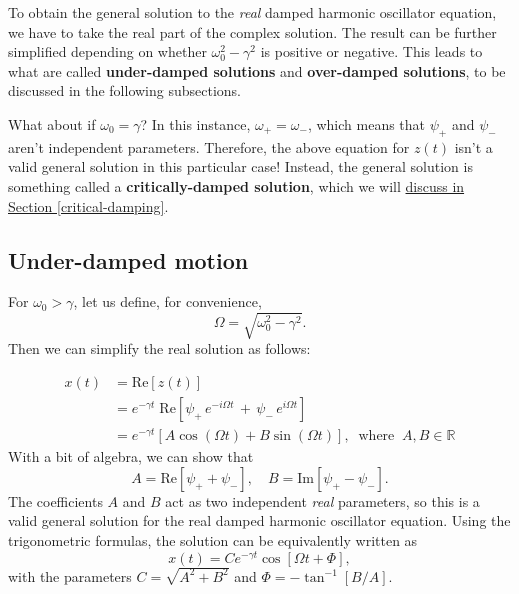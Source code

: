 \documentclass[10pt,a4paper]{article}
\begin{document}
To obtain the general solution to the \emph{real} damped harmonic
oscillator equation, we have to take the real part of the complex
solution. The result can be further simplified depending on whether
$\omega_0^2 - \gamma^2$ is positive or negative.  This leads to what
are called \textbf{under-damped solutions} and \textbf{over-damped
  solutions}, to be discussed in the following subsections.

What about if $\omega_0 = \gamma$? In this instance, $\omega_+ =
\omega_-$, which means that $\psi_+$ and $\psi_-$ aren't independent
parameters. Therefore, the above equation for $z(t)$ isn't a valid
general solution in this particular case!  Instead, the general
solution is something called a \textbf{critically-damped solution},
which we will \hyperref[critical-damping]{discuss in Section
  \ref{critical-damping}}.

\subsection{Under-damped motion}
\label{under-damped-motion}

For $\omega_0 > \gamma$, let us define, for convenience,
\begin{equation}
  \Omega = \sqrt{\omega_0^2 - \gamma^2}.
\end{equation}
Then we can simplify the real solution as follows:

\begin{align}
  x(t) &= \mathrm{Re}\left[z(t)\right] \\
  &= e^{-\gamma t} \; \mathrm{Re}\left[\psi_+ \, e^{-i \Omega t} \,+\, \psi_- \, e^{i\Omega t}\right] \\
  &= e^{-\gamma t} \left[ A\cos\left(\Omega t\right) + B \sin\left(\Omega t\right)\right], \;\;\mathrm{where}\;\; A, B \in \mathbb{R}
\end{align}
With a bit of algebra, we can show that
\begin{equation}
  A = \mathrm{Re}\left[\psi_+ + \psi_-\right],
  \quad B = \mathrm{Im}\left[\psi_+ - \psi_-\right].
\end{equation}
The coefficients $A$ and $B$ act as two independent \emph{real}
parameters, so this is a valid general solution for the real damped
harmonic oscillator equation. Using the trigonometric formulas, the
solution can be equivalently written as
\begin{equation}
x(t) = C e^{-\gamma t} \cos\left[\Omega t + \Phi\right],
\end{equation}
with the parameters $C = \sqrt{A^2 + B^2}$ and $\Phi = -
\tan^{-1}\left[B/A\right]$.
\end{document}
